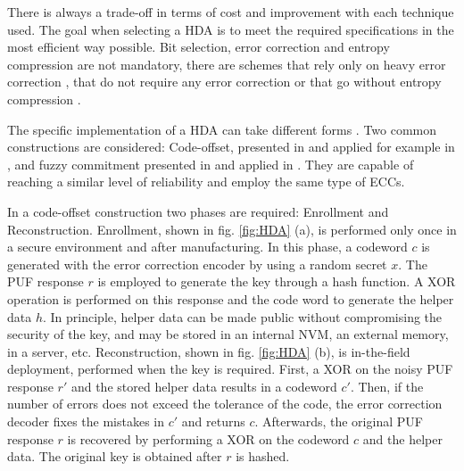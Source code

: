 There is always a trade-off in terms of cost and improvement with each technique used. The goal when selecting a HDA is to meet the required specifications in the most efficient way possible. Bit selection, error correction and entropy compression are not mandatory, there are schemes that rely only on heavy error correction \cite{Bosch2008}, that do not require any error correction \cite{Liu2017} or that go without entropy compression \cite{Martinez-Rodriguez2018}.  


The specific implementation of a HDA can take different forms \cite{Hiller2020}. Two common constructions are considered:  Code-offset, presented in \cite{Dodis2004} and applied for example in \cite{Maes2009,Bosch2008}, and fuzzy commitment presented in \cite{Juels1999} and applied in \cite{VanDerLeest2012soft,Kusters2017}. They are capable of reaching a similar level of reliability \cite{Yu2013} and employ the same type of ECCs. 


In a code-offset construction two phases are required: Enrollment and Reconstruction. Enrollment, shown in fig. \ref{fig:HDA} (a), is performed only once in a secure environment and after manufacturing. In this phase, a codeword $c$ is generated with the error correction encoder by using a random secret $x$. The PUF response $r$ is employed to generate the key through a hash function. A XOR operation is performed on this response and the code word to generate the helper data $h$. In principle, helper data can be made public without compromising the security of the key, and may be stored in an internal NVM, an external memory, in a server, etc. Reconstruction, shown in fig. \ref{fig:HDA} (b), is in-the-field deployment, performed when the key is required. First, a XOR on the noisy PUF response $r'$ and the stored helper data results in a codeword $c'$. Then, if the number of errors does not exceed the tolerance of the code, the error correction decoder fixes the mistakes in $c'$ and returns $c$. Afterwards,  the original PUF response $r$ is recovered by performing a XOR on the codeword $c$ and the helper data. The original key is obtained after $r$ is hashed.  



